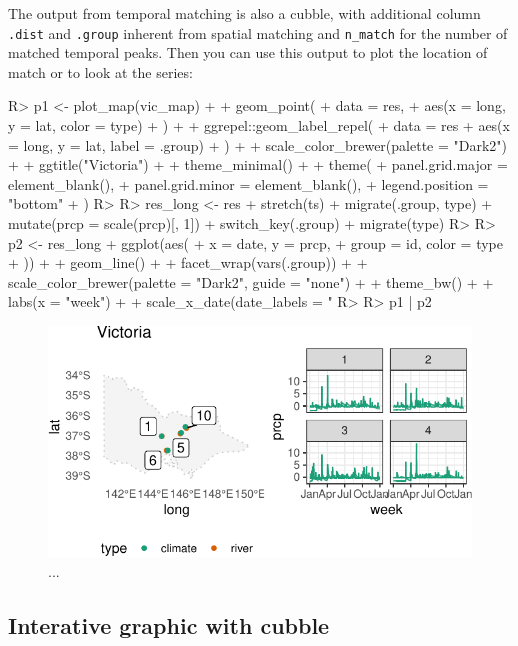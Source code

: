 \documentclass[
]{jss}
\begin{document}
The output from temporal matching is also a cubble, with additional
column \texttt{.dist} and \texttt{.group} inherent from spatial matching
and \texttt{n\_match} for the number of matched temporal peaks. Then you
can use this output to plot the location of match or to look at the
series:

\begin{CodeChunk}
\begin{CodeInput}
R> p1 <- plot_map(vic_map) +
+   geom_point(
+     data = res,
+     aes(x = long, y = lat, color = type)
+   ) +
+   ggrepel::geom_label_repel(
+     data = res %
+     aes(x = long, y = lat, label = .group)
+   ) +
+   scale_color_brewer(palette = "Dark2") +
+   ggtitle("Victoria") +
+   theme_minimal() +
+   theme(
+     panel.grid.major = element_blank(),
+     panel.grid.minor = element_blank(),
+     legend.position = "bottom"
+   )
R> 
R> res_long <- res %
+   stretch(ts) %
+   migrate(.group, type) %
+   mutate(prcp = scale(prcp)[, 1]) %
+   switch_key(.group) %
+   migrate(type)
R> 
R> p2 <- res_long %
+   ggplot(aes(
+     x = date, y = prcp,
+     group = id, color = type
+   )) +
+   geom_line() +
+   facet_wrap(vars(.group)) +
+   scale_color_brewer(palette = "Dark2", guide = "none") +
+   theme_bw() +
+   labs(x = "week") +
+   scale_x_date(date_labels = "%
R> 
R> p1 | p2
\end{CodeInput}
\begin{figure}

{\centering \includegraphics[width=1\linewidth]{figures/unnamed-chunk-22-1} 

}

\caption[..]{...}\label{fig:unnamed-chunk-22}
\end{figure}
\end{CodeChunk}

\hypertarget{interative-graphic-with-cubble}{%
\subsection{Interative graphic with
cubble}\label{interative-graphic-with-cubble}}
\end{document}
